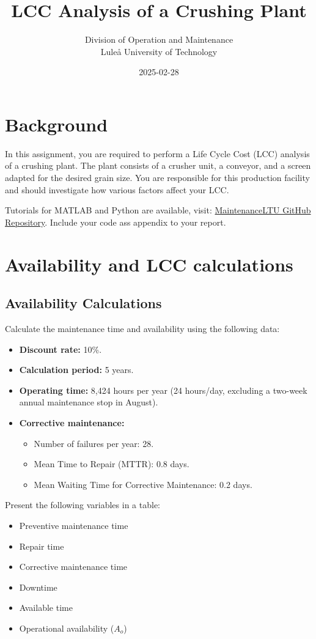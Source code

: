 \documentclass[a4paper,12pt]{exam}
\title{LCC Analysis of a Crushing Plant}
\author{Division of Operation and Maintenance \\
        Lule\aa{} University of Technology}
\date{2025-02-28}
\begin{document}
\maketitle

\section*{Background}
In this assignment, you are required to perform a Life Cycle Cost (LCC) analysis of a crushing plant. The plant consists of a crusher unit, a conveyor, and a screen adapted for the desired grain size. You are responsible for this production facility and should investigate how various factors affect your LCC.


Tutorials for MATLAB and Python are available, visit:  
\href{https://github.com/MaintenanceLTU/D0002B/tree/main/Maintenance%20Cost%20and%20LCC}{MaintenanceLTU GitHub Repository}. Include your code ass appendix to your report. 
\section{Availability and LCC calculations}
\subsection{Availability Calculations}
Calculate the maintenance time and availability using the following data:
\begin{itemize}
    \item \textbf{Discount rate:} 10\%.
    \item \textbf{Calculation period:} 5 years.
    \item \textbf{Operating time:} 8,424 hours per year (24 hours/day, excluding a two-week annual maintenance stop in August).
    \item \textbf{Corrective maintenance:}
    \begin{itemize}
        \item Number of failures per year: 28.
        \item Mean Time to Repair (MTTR): 0.8 days.
        \item Mean Waiting Time for Corrective Maintenance: 0.2 days.
    \end{itemize}
\end{itemize}
Present the following variables in a table: 
\begin{itemize}
    \item Preventive maintenance time
    \item Repair time
    \item Corrective maintenance time
    \item Downtime
    \item Available time
    \item Operational availability ($A_o$)
\end{itemize}
\end{document}
